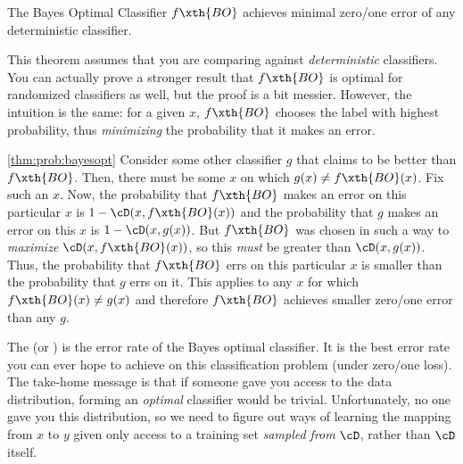 \begin{theorem} \label{thm:prob:bayesopt}
  The Bayes Optimal Classifier $f\xth{BO}$ achieves minimal zero/one
  error of any deterministic classifier.
\end{theorem}

This theorem assumes that you are comparing against
\emph{deterministic} classifiers.  You can actually prove a stronger
result that $f\xth{BO}$ is optimal for randomized classifiers as well,
but the proof is a bit messier.  However, the intuition is the same:
for a given $x$, $f\xth{BO}$ chooses the label with highest
probability, thus \emph{minimizing} the probability that it makes an
error.

\begin{myproof}{\ref{thm:prob:bayesopt}}
  Consider some other classifier $g$ that claims to be better than
  $f\xth{BO}$.  Then, there must be some $x$ on which $g(x) \neq f\xth{BO}(x)$.  Fix
  such an $x$.  Now, the probability that $f\xth{BO}$ makes an error on this
  particular $x$ is $1 - \cD(x, f\xth{BO}(x))$ and the probability
  that $g$ makes an error on this $x$ is $1 - \cD(x, g(x))$.  But
  $f\xth{BO}$ was chosen in such a way to \emph{maximize} $\cD(x,
  f\xth{BO}(x))$, so this \emph{must} be greater than $\cD(x, g(x))$.
  Thus, the probability that $f\xth{BO}$ errs on this particular $x$ is
  smaller than the probability that $g$ errs on it.  This applies to
  any $x$ for which $f\xth{BO}(x) \neq g(x)$ and therefore $f\xth{BO}$ achieves
  smaller zero/one error than any $g$.
\end{myproof}

The  (or )
is the error rate of the Bayes optimal classifier.  It is the best
error rate you can ever hope to achieve on this classification problem
(under zero/one loss).
%
The take-home message is that if someone gave you access to the data
distribution, forming an \emph{optimal} classifier would be trivial.
Unfortunately, no one gave you this distribution, so we need to
figure out ways of learning the mapping from $x$ to $y$ given only access to a training set \emph{sampled from} $\cD$, rather than $\cD$ itself.


